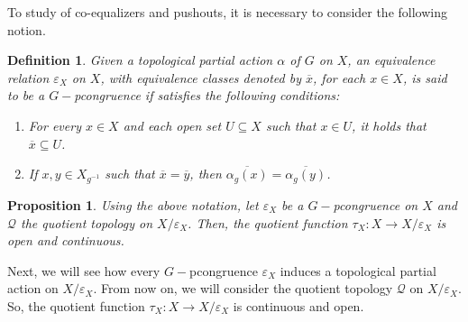 \documentclass[sn-mathphys-num]{sn-jnl}%
\theoremstyle{thmstyleone}%
\newtheorem{proposition}[theorem]{Proposition}%
\theoremstyle{thmstyletwo}%
\theoremstyle{thmstylethree}%
\newtheorem{definition}{Definition}%
\begin{document}
To study of co-equalizers and pushouts, it is necessary  to consider the following notion.\\

\begin{definition}\label{gpcong}
Given a topological partial action $\alpha$ of $G$ on $X$, an equivalence relation $\varepsilon_X$ on $X$, with equivalence classes denoted by $\overline{x}$, for each $x \in X$, is said to be a $G-$pcongruence if satisfies the following conditions:
\begin{enumerate}
  \item For every $x \in X$ and each open set $U \subseteq X$ such that $x \in U$, it holds that $\overline{x} \subseteq U$.
  \item If $x, y \in X_{g^{-1}}$ such that $\overline{x} = \overline{y}$, then $\overline{\alpha_g(x)} = \overline{\alpha_g(y)}$.
\end{enumerate}
\end{definition}

\begin{proposition}Using the above notation, let $\varepsilon_X$ be a $G-$pcongruence on $X$ and $\mathcal{Q}$ the quotient topology on $X/\varepsilon_X$. Then, the quotient function  $\tau_X: X \to X/\varepsilon_X$ is open and continuous.\\
\end{proposition}

Next, we will see how every $G-$pcongruence  $\varepsilon_X$ induces a topological partial action on $X/\varepsilon_X$. From now on, we will consider the quotient topology $\mathcal{Q}$ on $ X / \varepsilon_X$. So, the quotient function $\tau_X: X \to X / \varepsilon_X$ is continuous and open.\\
\end{document}

